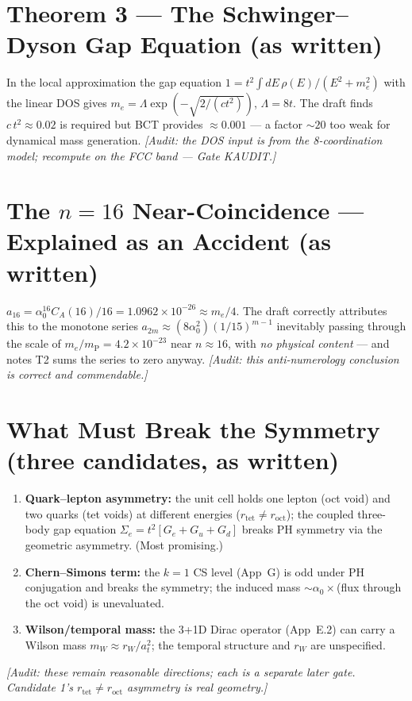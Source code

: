 \documentclass[aps,prl,preprint,superscriptaddress,floatfix]{revtex4-2}
\newcommand{\az}{\alpha_0}
\newcommand{\mP}{m_{\mathrm{P}}}
\newcommand{\me}{m_e}
\newcommand{\roct}{r_{\mathrm{oct}}}
\newcommand{\rtet}{r_{\mathrm{tet}}}
\begin{document}
\section{Theorem 3 --- The Schwinger--Dyson Gap Equation (as written)}
In the local approximation the gap equation $1=t^2\!\int dE\,\rho(E)/(E^2+\me^2)$ with the linear
DOS gives $\me=\Lambda\exp(-\sqrt{2/(ct^2)})$, $\Lambda=8t$. The draft finds $c\,t^2\approx0.02$ is
required but BCT provides $\approx0.001$ --- a factor $\sim20$ too weak for dynamical mass
generation. \emph{[Audit: the DOS input is from the 8-coordination model; recompute on the FCC
band --- Gate KAUDIT.]}

\section{The $n=16$ Near-Coincidence --- Explained as an Accident (as written)}
$a_{16}=\az^{16}C_A(16)/16=1.0962\times10^{-26}\approx\me/4$. The draft correctly attributes this
to the monotone series $a_{2m}\approx(8\az^2)(1/15)^{m-1}$ inevitably passing through the scale of
$\me/\mP=4.2\times10^{-23}$ near $n\approx16$, with \emph{no physical content} --- and notes T2
sums the series to zero anyway. \emph{[Audit: this anti-numerology conclusion is correct and
commendable.]}

\section{What Must Break the Symmetry (three candidates, as written)}
\begin{enumerate}\itemsep0pt
\item \textbf{Quark--lepton asymmetry:} the unit cell holds one lepton (oct void) and two quarks
(tet voids) at different energies ($\rtet\neq\roct$); the coupled three-body gap equation
$\Sigma_e=t^2[G_e+G_u+G_d]$ breaks PH symmetry via the geometric asymmetry. (Most promising.)
\item \textbf{Chern--Simons term:} the $k=1$ CS level (App~G) is odd under PH conjugation and
breaks the symmetry; the induced mass $\sim\az\times$(flux through the oct void) is unevaluated.
\item \textbf{Wilson/temporal mass:} the 3+1D Dirac operator (App~E.2) can carry a Wilson mass
$m_W\approx r_W/a_t^2$; the temporal structure and $r_W$ are unspecified.
\end{enumerate}
\emph{[Audit: these remain reasonable directions; each is a separate later gate. Candidate 1's
$\rtet\neq\roct$ asymmetry is real geometry.]}
\end{document}

